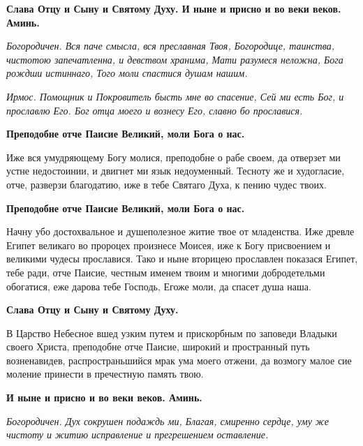 \bfseries Слава Отцу и Сыну и Святому Духу. И ныне и присно и во веки веков. Аминь.\normalfont{}


\itshape Богородичен.\normalfont{} Вся паче смысла, вся преславная Твоя, Богородице, таинства, чистотою запечатленна, и девством хранима, Мати разумеся неложна, Бога рождши истиннаго, Того моли спастися душам нашим.








\itshape Ирмос.\normalfont{} Помощник и Покровитель бысть мне во спасение, Сей ми есть Бог, и прославлю Его. Бог отца моего и вознесу Его, славно бо прославися.




\bfseries Преподобне отче Паисие Великий, моли Бога о нас.\normalfont{}




Иже вся умудряющему Богу молися, преподобне о рабе своем, да отверзет ми устне недостоинии, и двигнет ми язык недоуменный. Тесноту же и худогласие, отче, разверзи благодатию, иже в тебе Святаго Духа, к пению чудес твоих.




\bfseries Преподобне отче Паисие Великий, моли Бога о нас.\normalfont{} 




Начну убо достохвальное и душеполезное житие твое от младенства. Иже древле Египет великаго во пророцех произнесе Моисея, иже к Богу присвоением и великими чудесы прославися. Тако и ныне вторицею прославлен показася Египет, тебе ради, отче Паисие, честным именем твоим и многими добродетельми обогатися, еже дарова тебе Господь, Егоже моли, да спасет душа наша. 




\bfseries Слава Отцу и Сыну и Святому Духу.\normalfont{} 




В Царство Небесное вшед узким путем и прискорбным по заповеди Владыки своего Христа, преподобне отче Паисие, широкий и пространный путь
возненавидев, распространьшийся мрак ума моего отжени, да возмогу малое сие моление принести в пречестную память твою. 




\bfseries И ныне и присно и во веки веков. Аминь.\normalfont{} 




\itshape Богородичен.\normalfont{} Дух сокрушен подаждь ми, Благая, смиренно сердце, уму же чистоту и житию исправление и прегрешением оставление. 




